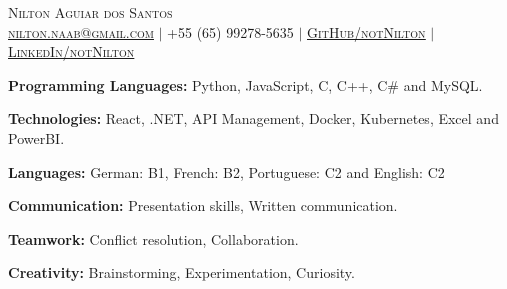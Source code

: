 \documentclass[9pt]{developercv} %
\begin{document}

\newcommand{\yourName}{Nilton Aguiar dos Santos}
\newcommand{\yourEmail}{nilton.naab@gmail.com}
\newcommand{\yourPhone}{+55 (65) 99278-5635 }
\newcommand{\githubUserName}{notNilton}
\newcommand{\linkedinUserName}{notNilton}

\begin{center}
    \Huge 
    \scshape {\yourName} \\ 
    \vspace{10pt}
    \normalsize 
    \href{mailto:\yourEmail}{\underline{\yourEmail}}
    \enspace $|$ \enspace
    \yourPhone
    \enspace $|$ \enspace
    \href{https://github.com/\githubUserName}{\underline{GitHub/\githubUserName}}
    \enspace $|$ \enspace
    \href{https://www.linkedin.com/in/notnilton/}{\underline{LinkedIn/\linkedinUserName}}

\end{center}



\begin{minipage}[t]{0.55\textwidth}
	\vspace{-6pt}
 
        \textbf{Programming Languages: }{Python, JavaScript, C, C++, C\# and MySQL.}
        
        \vspace{2.5pt}
        
        \textbf{Technologies: }{React, .NET, API Management, Docker, Kubernetes, Excel and PowerBI.}
       
        \vspace{2.5pt}
        
        \textbf{Languages: }{{German: }{B1}, {French: }{B2}, {Portuguese: }{C2} and {English: }{C2}}

\end{minipage}
\hfill %
\begin{minipage}[t]{0.40\textwidth}
	\vspace{-6pt}
 
        \textbf{Communication: }{Presentation skills, Written communication.}
        
        \vspace{2.5pt}
        
        \textbf{Teamwork: }{Conflict resolution, Collaboration.}

        \vspace{2.5pt}
        
        \textbf{Creativity: }{Brainstorming, Experimentation, Curiosity.}
\end{minipage}
\end{document}

